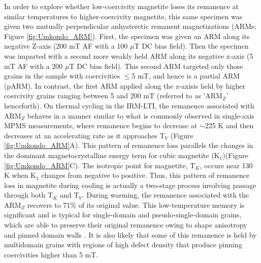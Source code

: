 \documentclass[draft,gc]{AGUTeX}
\begin{document}
\begin{article}
In order to explore whether low-coercivity magnetite loses its remanence at similar temperatures to higher-coercivity magnetite, this same specimen was given two mutually perpendicular anhysteretic remanent magnetizations (ARMs; Figure \ref{fig:Umkondo_ARM}). First, the specimen was given an ARM along its negative Z-axis (200 mT AF with a 100 $\mu$T DC bias field).  Then the specimen was imparted with a second more weakly held ARM along its negative x-axis (5 mT AF with a 200 $\mu$T DC bias field).  This second ARM targeted only those grains in the sample with coercivities $\leq$5 mT, and hence is a partial ARM (pARM). In contrast, the first ARM applied along the z-axisis held by higher coercivity grains ranging between 5 and 200 mT (referred to as 'ARM$_{Z}$' henceforth). On thermal cycling in the IRM-LTI, the remanence associated with ARM$_{Z}$ behaves in a manner similar to what is commonly observed in single-axis MPMS measurements, where remanence begins to decrease at $\sim$225 K and then decreases at an accelerating rate as it approaches T$_{V}$ (Figure \ref{fig:Umkondo_ARM}A). This pattern of remanence loss parallels the changes in the dominant magnetocrystalline energy term for cubic magnetite (K$_{1}$)(Figure \ref{fig:Umkondo_ARM}C). The isotropic point for magnetite, T$_{K}$, occurs near 130 K when K$_{1}$ changes from negative to positive. Thus, this pattern of remanence loss in magnetite during cooling is actually a two-stage process involving passage through both T$_{K}$ and T$_{V}$. During warming, the remanence associated with the ARM$_{Z}$ recovers to 71\% of its original value. This low-temperature memory is significant and is typical for single-domain and pseudo-single-domain grains, which are able to preserve their original remanence owing to shape anisotropy and pinned domain walls \citep{Dunlop1997a}. It is also likely that some of this remanence is held by multidomain grains with regions of high defect density that produce pinning coercivities higher than 5 mT.


\end{article}
\end{document}
